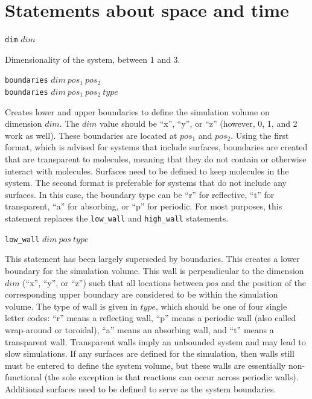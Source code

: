 \documentclass {book}
\newcommand {\ttt} {\texttt}
\begin{document}
\section{Statements about space and time}

\begin{description}

\item{\ttt{dim} $dim$}

Dimensionality of the system, between 1 and 3.

\item{\ttt{boundaries} $dim\ pos_1\ pos_2$\\
\ttt{boundaries} $dim\ pos_1\ pos_2\ type$}

Creates lower and upper boundaries to define the simulation volume on dimension $dim$. The $dim$ value should be ``x'', ``y'', or ``z'' (however, 0, 1, and 2 work as well). These boundaries are located at $pos_1$ and $pos_2$. Using the first format, which is advised for systems that include surfaces, boundaries are created that are transparent to molecules, meaning that they do not contain or otherwise interact with molecules. Surfaces need to be defined to keep molecules in the system. The second format is preferable for systems that do not include any surfaces. In this case, the boundary type can be ``r'' for reflective, ``t'' for transparent, ``a'' for absorbing, or ``p'' for periodic. For most purposes, this statement replaces the \ttt{low\_wall} and \ttt{high\_wall} statements.

\item{\ttt{low\_wall} $dim\ pos\ type$}

This statement has been largely superseded by boundaries. This creates a lower boundary for the simulation volume. This wall is perpendicular to the dimension $dim$ (``x'', ``y'', or ``z'') such that all locations between $pos$ and the position of the corresponding upper boundary are considered to be within the simulation volume. The type of wall is given in $type$, which should be one of four single letter codes: ``r'' means a reflecting wall, ``p'' means a periodic wall (also called wrap-around or toroidal), ``a'' means an absorbing wall, and ``t'' means a transparent wall. Transparent walls imply an unbounded system and may lead to slow simulations. If any surfaces are defined for the simulation, then walls still must be entered to define the system volume, but these walls are essentially non-functional (the sole exception is that reactions can occur across periodic walls). Additional surfaces need to be defined to serve as the system boundaries.


\end{description}
\end{document}
